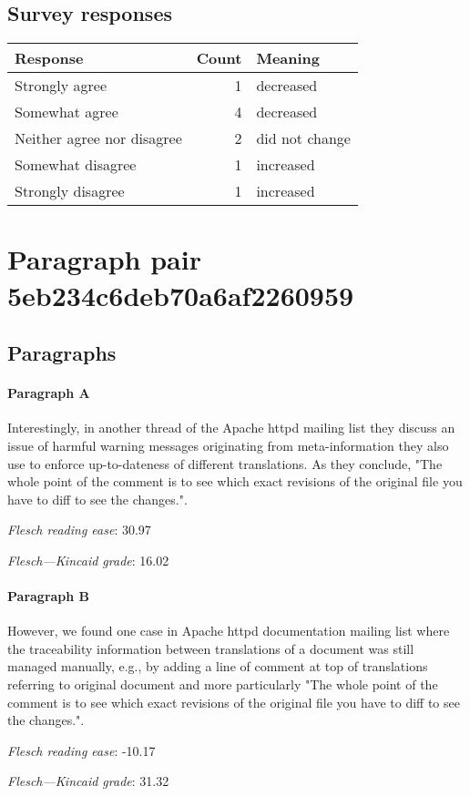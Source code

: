\subsection{Survey responses}
\begin{tabular}{lrl}
\toprule
          \textbf{Response} &  \textbf{Count} & \textbf{Meaning} \\
\midrule
             Strongly agree &               1 &        decreased \\
             Somewhat agree &               4 &        decreased \\
 Neither agree nor disagree &               2 &   did not change \\
          Somewhat disagree &               1 &        increased \\
          Strongly disagree &               1 &        increased \\
\bottomrule
\end{tabular}

\section{Paragraph pair 5eb234c6deb70a6af2260959}
\subsection{Paragraphs}
\paragraph{Paragraph A}
Interestingly, in another thread of the Apache httpd mailing list they discuss an issue of harmful warning messages originating from meta-information they also use to enforce up-to-dateness of different translations. As they conclude, "The whole point of the comment is to see which exact revisions of the original file you have to diff to see the changes.".\par\medskip
\emph{Flesch reading ease}: 30.97\par
\emph{Flesch---Kincaid grade}: 16.02

\paragraph{Paragraph B}
However, we found one case in Apache httpd documentation mailing list where the traceability information between translations of a document was still managed manually, e.g., by adding a line of comment at top of translations referring to original document and more particularly "The whole point of the comment is to see which exact revisions of the original file you have to diff to see the changes.".\par\medskip
\emph{Flesch reading ease}: -10.17\par
\emph{Flesch---Kincaid grade}: 31.32

